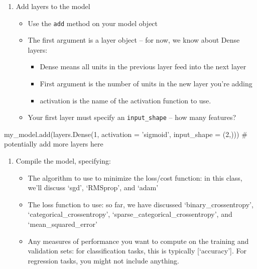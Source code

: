 \documentclass[]{extarticle}
\newenvironment{Shaded}{\begin{snugshade}}{\end{snugshade}}
\newcommand{\CommentTok}[1]{\textcolor[rgb]{0.50,0.62,0.50}{#1}}
\newcommand{\DecValTok}[1]{\textcolor[rgb]{0.86,0.86,0.80}{#1}}
\newcommand{\NormalTok}[1]{\textcolor[rgb]{0.80,0.80,0.80}{#1}}
\newcommand{\OperatorTok}[1]{\textcolor[rgb]{0.94,0.94,0.82}{#1}}
\newcommand{\StringTok}[1]{\textcolor[rgb]{0.80,0.58,0.58}{#1}}
\providecommand{\tightlist}{%
  \setlength{\itemsep}{0pt}\setlength{\parskip}{0pt}}
\begin{document}
\begin{enumerate}
\def\labelenumi{\arabic{enumi}.}
\setcounter{enumi}{1}
\tightlist
\item
  Add layers to the model

  \begin{itemize}
  \tightlist
  \item
    Use the \texttt{add} method on your model object
  \item
    The first argument is a layer object -- for now, we know about Dense
    layers:

    \begin{itemize}
    \tightlist
    \item
      Dense means all units in the previous layer feed into the next
      layer
    \item
      First argument is the number of units in the new layer you're
      adding
    \item
      activation is the name of the activation function to use.\\
    \end{itemize}
  \item
    Your first layer must specify an \texttt{input\_shape} -- how many
    features?
  \end{itemize}
\end{enumerate}

\begin{Shaded}
\begin{Highlighting}[]
\NormalTok{my_model.add(layers.Dense(}\DecValTok{1}\NormalTok{, activation }\OperatorTok{=} \StringTok{'sigmoid'}\NormalTok{, input_shape }\OperatorTok{=}\NormalTok{ (}\DecValTok{2}\NormalTok{,)))}
\CommentTok{# potentially add more layers here}
\end{Highlighting}
\end{Shaded}

\begin{enumerate}
\def\labelenumi{\arabic{enumi}.}
\setcounter{enumi}{2}
\tightlist
\item
  Compile the model, specifying:

  \begin{itemize}
  \tightlist
  \item
    The algorithm to use to minimize the loss/cost function: in this
    class, we'll discuss `sgd', `RMSprop', and `adam'
  \item
    The loss function to use: so far, we have discussed
    `binary\_crossentropy', `categorical\_crossentropy',
    `sparse\_categorical\_crossentropy', and `mean\_squared\_error'
  \item
    Any measures of performance you want to compute on the training and
    validation sets: for classification tasks, this is typically
    {[}`accuracy'{]}. For regression tasks, you might not include
    anything.
  \end{itemize}
\end{enumerate}
\end{document}
